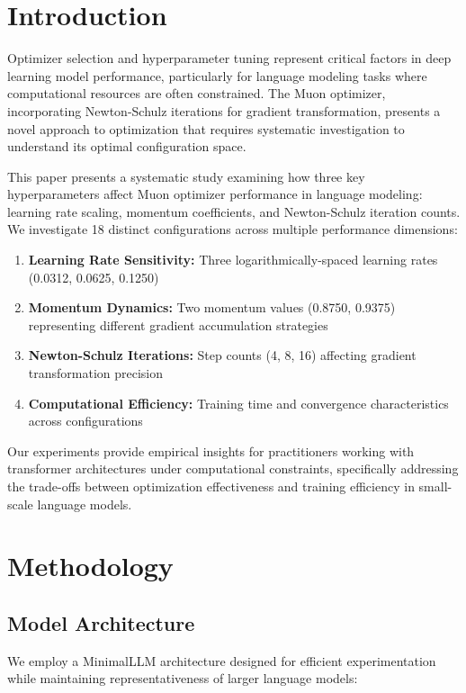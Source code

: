 \documentclass[11pt,a4paper]{article}
\begin{document}
\section{Introduction}

Optimizer selection and hyperparameter tuning represent critical factors in deep learning model performance, particularly for language modeling tasks where computational resources are often constrained. The Muon optimizer, incorporating Newton-Schulz iterations for gradient transformation, presents a novel approach to optimization that requires systematic investigation to understand its optimal configuration space.

This paper presents a systematic study examining how three key hyperparameters affect Muon optimizer performance in language modeling: learning rate scaling, momentum coefficients, and Newton-Schulz iteration counts. We investigate 18 distinct configurations across multiple performance dimensions:

\begin{enumerate}
    \item \textbf{Learning Rate Sensitivity:} Three logarithmically-spaced learning rates (0.0312, 0.0625, 0.1250)
    \item \textbf{Momentum Dynamics:} Two momentum values (0.8750, 0.9375) representing different gradient accumulation strategies
    \item \textbf{Newton-Schulz Iterations:} Step counts (4, 8, 16) affecting gradient transformation precision
    \item \textbf{Computational Efficiency:} Training time and convergence characteristics across configurations
\end{enumerate}

Our experiments provide empirical insights for practitioners working with transformer architectures under computational constraints, specifically addressing the trade-offs between optimization effectiveness and training efficiency in small-scale language models.

\section{Methodology}

\subsection{Model Architecture}
We employ a MinimalLLM architecture designed for efficient experimentation while maintaining representativeness of larger language models:
\end{document}

